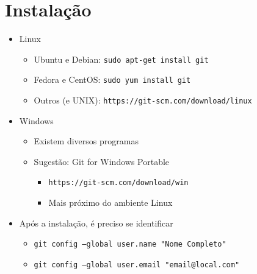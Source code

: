 \documentclass{beamer}
\newenvironment{slide}{\begin{frame}{\insertsection}}{\end{frame}}
\begin{document}
\section{Instalação}
\begin{slide}
    \begin{itemize}
        \item Linux
        \begin{itemize}
            \pause
            \item Ubuntu e Debian: \texttt{sudo apt-get install git}
            \pause
            \item Fedora e CentOS: \texttt{sudo yum install git}
            \pause
            \item Outros (e UNIX): \texttt{https://git-scm.com/download/linux}
        \end{itemize}
        \pause
        \item Windows
        \begin{itemize}
            \pause
            \item Existem diversos programas
            \pause
            \item Sugestão: Git for Windows Portable
            \begin{itemize}
                \pause
                \item \texttt{https://git-scm.com/download/win}
                \pause
                \item Mais próximo do ambiente Linux
            \end{itemize}
        \end{itemize}
        \pause
        \item Após a instalação, é preciso se identificar
        \begin{itemize}
            \pause
            \item \texttt{git config --global user.name "Nome Completo"}
            \item \texttt{git config --global user.email "email@local.com"}
        \end{itemize}
    \end{itemize}
\end{slide}
\end{document}
